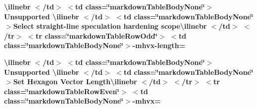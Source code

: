 \begin{longtabu}
{\bfseries{{\ttfamily \textbackslash{}ilinebr \texorpdfstring{$<$}{<}/td\texorpdfstring{$>$}{>} \texorpdfstring{$<$}{<}td class=\char`\"{}markdown\+Table\+Body\+None\char`\"{}\texorpdfstring{$>$}{>} Unsupported \textbackslash{}ilinebr \texorpdfstring{$<$}{<}/td\texorpdfstring{$>$}{>} \texorpdfstring{$<$}{<}td class=\char`\"{}markdown\+Table\+Body\+None\char`\"{}\texorpdfstring{$>$}{>}}Select straight-\/line speculation hardening scope{\ttfamily \textbackslash{}ilinebr \texorpdfstring{$<$}{<}/td\texorpdfstring{$>$}{>} \texorpdfstring{$<$}{<}/tr\texorpdfstring{$>$}{>} \texorpdfstring{$<$}{<}tr class=\char`\"{}markdown\+Table\+Row\+Odd\char`\"{}\texorpdfstring{$>$}{>} \texorpdfstring{$<$}{<}td class=\char`\"{}markdown\+Table\+Body\+None\char`\"{}\texorpdfstring{$>$}{>}}-\/mhvx-\/length=}}

{\bfseries{{\ttfamily \textbackslash{}ilinebr \texorpdfstring{$<$}{<}/td\texorpdfstring{$>$}{>} \texorpdfstring{$<$}{<}td class=\char`\"{}markdown\+Table\+Body\+None\char`\"{}\texorpdfstring{$>$}{>} Unsupported \textbackslash{}ilinebr \texorpdfstring{$<$}{<}/td\texorpdfstring{$>$}{>} \texorpdfstring{$<$}{<}td class=\char`\"{}markdown\+Table\+Body\+None\char`\"{}\texorpdfstring{$>$}{>}}Set Hexagon Vector Length{\ttfamily \textbackslash{}ilinebr \texorpdfstring{$<$}{<}/td\texorpdfstring{$>$}{>} \texorpdfstring{$<$}{<}/tr\texorpdfstring{$>$}{>} \texorpdfstring{$<$}{<}tr class=\char`\"{}markdown\+Table\+Row\+Even\char`\"{}\texorpdfstring{$>$}{>} \texorpdfstring{$<$}{<}td class=\char`\"{}markdown\+Table\+Body\+None\char`\"{}\texorpdfstring{$>$}{>}}-\/mhvx=}}


\end{longtabu}
